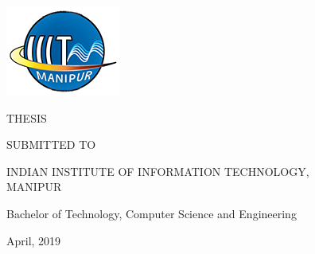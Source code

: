 \documentclass[12pt]{report}
\date{}
\title{\vspace{-4.0cm}\myfont{\textbf{ SOCIAL MEDIA ANDROID APPLICATION}}}
\author{\authorfont BY \\ \authorfont RADHE RAMAN TIWARI \\ \authorfont ROLL NO. 17010115\\ Supervised by \\ Mr. Himangshu Sarma}
\begin{document}
\begin{figure}

\maketitle
\bigskip 
\includegraphics[scale=1]{iiitm-logo.png}
\centering

\bigskip \bigskip 

THESIS\bigskip
 
SUBMITTED TO\bigskip
 
INDIAN INSTITUTE OF INFORMATION TECHNOLOGY, MANIPUR\bigskip\bigskip \bigskip 
 
Bachelor of Technology, Computer Science and Engineering\bigskip 

April, 2019
\end{figure}













\tableofcontents

\listoffigures

















\end{document}
